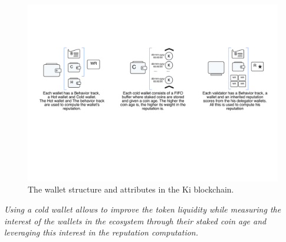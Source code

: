 \begin{figure}
	\includegraphics[width=\linewidth, trim= 1cm 8cm 1cm 5cm, clip]{Figures/wallets.pdf}
	\caption{The wallet structure and attributes in the Ki blockchain.}
	\label{fig:wallets}
\end{figure}

\textit{Using a cold wallet allows to improve the token liquidity while measuring the interest of the wallets in the ecosystem through their staked coin age and leveraging this interest in the reputation computation.}

